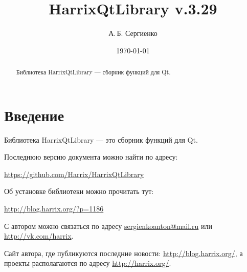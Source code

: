 \documentclass[a4paper,12pt]{article}
\title{HarrixQtLibrary v.3.29}
\author{А.\,Б. Сергиенко}
\date{\today}
\begin{document}


\maketitle

\begin{abstract}
Библиотека HarrixQtLibrary --- сборник функций для Qt.
\end{abstract}

\tableofcontents

\newpage

\section{Введение}

Библиотека HarrixQtLibrary --- это сборник функций для Qt.

Последнюю версию документа можно найти по адресу:

\href{https://github.com/Harrix/HarrixQtLibrary}{https://github.com/Harrix/HarrixQtLibrary}

Об установке библиотеки можно прочитать тут:

\href{http://blog.harrix.org/?p=1186}{http://blog.harrix.org/?p=1186}

С автором можно связаться по адресу \href{mailto:sergienkoanton@mail.ru}{sergienkoanton@mail.ru} или  \href{http://vk.com/harrix}{http://vk.com/harrix}.

Сайт автора, где публикуются последние новости: \href{http://blog.harrix.org/}{http://blog.harrix.org/}, а проекты располагаются по адресу \href{http://harrix.org/}{http://harrix.org/}.


\newpage
\end{document}
